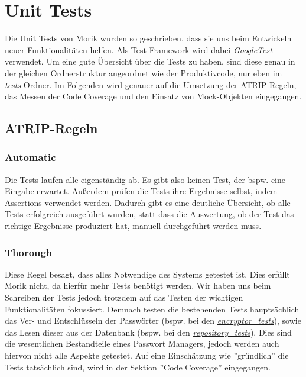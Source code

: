 \chapter{Unit Tests}
Die Unit Tests von Morik wurden so geschrieben, dass sie uns beim Entwickeln neuer Funktionalitäten helfen. Als Test-Framework wird dabei \href{https://github.com/moorts/Morik/blob/main/src/CMakeLists.txt#L24}{\textit{GoogleTest}} verwendet. Um eine gute Übersicht über die Tests zu haben, sind diese genau in der gleichen Ordnerstruktur angeordnet wie der Produktivcode, nur eben im \href{https://github.com/moorts/Morik/tree/main/src/tests}{\textit{tests}}-Ordner. Im Folgenden wird genauer auf die Umsetzung der ATRIP-Regeln, das Messen der Code Coverage und den Einsatz von Mock-Objekten eingegangen.

\section{ATRIP-Regeln}
\subsection{Automatic}
Die Tests laufen alle eigenständig ab. Es gibt also keinen Test, der bspw. eine Eingabe erwartet. Außerdem prüfen die Tests ihre Ergebnisse selbst, indem Assertions verwendet werden. Dadurch gibt es eine deutliche Übersicht, ob alle Tests erfolgreich ausgeführt wurden, statt dass die Auswertung, ob der Test das richtige Ergebnisse produziert hat, manuell durchgeführt werden muss.

\subsection{Thorough}
Diese Regel besagt, dass alles Notwendige des Systems getestet ist. Dies erfüllt Morik nicht, da hierfür mehr Tests benötigt werden. Wir haben uns beim Schreiben der Tests jedoch trotzdem auf das Testen der wichtigen Funktionalitäten fokussiert. Demnach testen die bestehenden Tests hauptsächlich das Ver- und Entschlüsseln der Passwörter (bspw. bei den \href{https://github.com/moorts/Morik/blob/main/src/tests/application/encryptor_tests.cpp}{\textit{encryptor\_tests}}), sowie das Lesen dieser aus der Datenbank (bspw. bei den \href{https://github.com/moorts/Morik/blob/main/src/tests/application/repository_tests.cpp}{\textit{repository\_tests}}). Dies sind die wesentlichen Bestandteile eines Passwort Managers, jedoch werden auch hiervon nicht alle Aspekte getestet. Auf eine Einschätzung wie ''gründlich'' die Tests tatsächlich sind, wird in der Sektion ''Code Coverage'' eingegangen.

